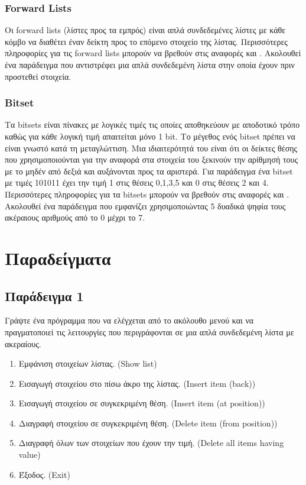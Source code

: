 \subsubsection{Forward Lists}
Οι forward lists (λίστες προς τα εμπρός) είναι απλά συνδεδεμένες λίστες με κάθε κόμβο να διαθέτει έναν δείκτη προς το επόμενο στοιχείο της λίστας. Περισσότερες πληροφορίες για τις forward lists μπορούν να βρεθούν στις αναφορές \cite{g4gforwardlist1} και \cite{g4gforwardlist2}. Ακολουθεί ένα παράδειγμα που αντιστρέφει μια απλά συνδεδεμένη λίστα στην οποία έχουν πριν προστεθεί στοιχεία.






\subsubsection{Bitset}
Τα bitsets είναι πίνακες με λογικές τιμές τις οποίες αποθηκεύουν με αποδοτικό τρόπο καθώς για κάθε λογική τιμή απαιτείται μόνο 1 bit. Το μέγεθος ενός bitset πρέπει να είναι γνωστό κατά τη μεταγλώττιση. Μια ιδιαιτερότητά του είναι ότι οι δείκτες θέσης που χρησιμοποιούνται για την αναφορά στα στοιχεία του ξεκινούν την αρίθμησή τους με το μηδέν από δεξιά και αυξάνονται προς τα αριστερά. Για παράδειγμα ένα bitset με τιμές 101011 έχει την τιμή 1 στις θέσεις 0,1,3,5 και 0 στις θέσεις 2 και 4. Περισσότερες πληροφορίες για τα bitsets μπορούν να βρεθούν στις αναφορές \cite{g4gbitset1} και \cite{g4gbitset2}. Ακολουθεί ένα παράδειγμα που εμφανίζει χρησιμοποιώντας 5 δυαδικά ψηφία τους ακέραιους αριθμούς από το 0 μέχρι το 7.





\section{Παραδείγματα}
\subsection{Παράδειγμα 1}
Γράψτε ένα πρόγραμμα που να ελέγχεται από το ακόλουθο μενού και να πραγματοποιεί τις λειτουργίες που περιγράφονται σε μια απλά συνδεδεμένη λίστα με ακεραίους.
\begin{enumerate}[nolistsep]
\item Εμφάνιση στοιχείων λίστας. (Show list)
\item Εισαγωγή στοιχείου στο πίσω άκρο της λίστας. (Insert item (back))
\item Εισαγωγή στοιχείου σε συγκεκριμένη θέση. (Insert item (at position)) 
\item Διαγραφή στοιχείου σε συγκεκριμένη θέση. (Delete item (from position))
\item Διαγραφή όλων των στοιχείων που έχουν την τιμή. (Delete all items having value)
\item Έξοδος. (Exit)
\end{enumerate}

